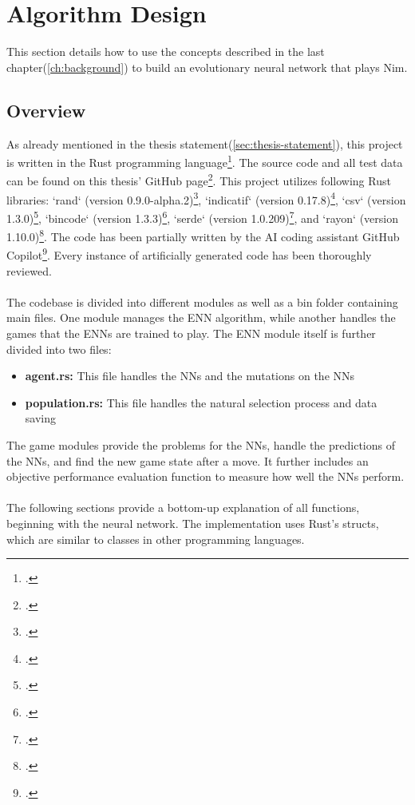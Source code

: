     \section{Algorithm Design}\label{sec:algorithm-design}
    This section details how to use the concepts described in the last chapter(\ref{ch:background}) to build an evolutionary neural network that plays Nim.

    \subsection{Overview}\label{subsec:overview}
    As already mentioned in the thesis statement(\ref{sec:thesis-statement}), this project is written in the Rust programming language\footcite{rust23}.
    The source code and all test data can be found on this thesis' GitHub page\footcite{RustENN}.
    This project utilizes following Rust libraries:
    `rand` (version 0.9.0-alpha.2)\footcite{rand2024},
    `indicatif` (version 0.17.8)\footcite{indicatif2023},
    `csv` (version 1.3.0)\footcite{csv2023},
    `bincode` (version 1.3.3)\footcite{bincode2021},
    `serde` (version 1.0.209)\footcite{serde2024},
    and `rayon` (version 1.10.0)\footcite{rayon2023}.
    The code has been partially written by the AI coding assistant GitHub Copilot\footcite{github_copilot2021}.
    Every instance of artificially generated code has been thoroughly reviewed.
    \\ \\
    The codebase is divided into different modules as well as a bin folder containing main files.
    One module manages the ENN algorithm, while another handles the games that the ENNs are trained to play.
    The ENN module itself is further divided into two files:
    \begin{itemize}
        \item \textbf{agent.rs:} This file handles the NNs and the mutations on the NNs
        \item \textbf{population.rs:} This file handles the natural selection process and data saving
    \end{itemize}
    The game modules provide the problems for the NNs, handle the predictions of the NNs, and find the new game state after a move.
    It further includes an objective performance evaluation function to measure how well the NNs perform.
    \\ \\
    The following sections provide a bottom-up explanation of all functions, beginning with the neural network.
    The implementation uses Rust's structs, which are similar to classes in other programming languages.

